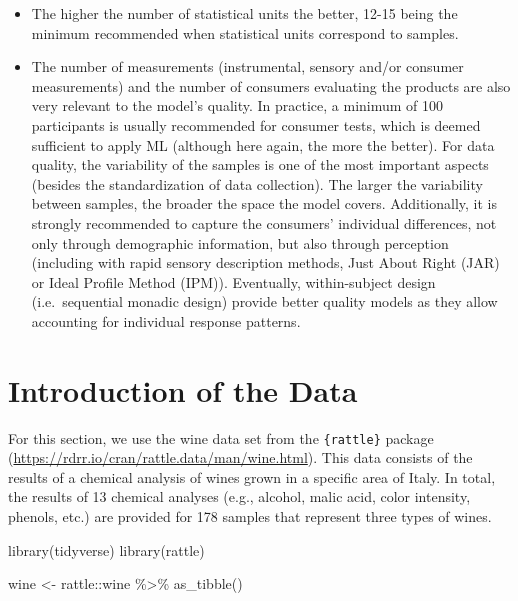 \documentclass[
]{krantz}
\makeatletter
\newenvironment{Shaded}{\begin{snugshade}}{\end{snugshade}}
\newcommand{\FunctionTok}[1]{\textcolor[rgb]{0,0,0}{#1}}
\newcommand{\NormalTok}[1]{#1}
\newcommand{\OtherTok}[1]{\textcolor[rgb]{0.37,0.37,0.37}{#1}}
\newcommand{\SpecialCharTok}[1]{\textcolor[rgb]{0,0,0}{#1}}
\providecommand{\tightlist}{%
  \setlength{\itemsep}{0pt}\setlength{\parskip}{0pt}}
\newenvironment{kframe}{%
\medskip{}
\setlength{\fboxsep}{.8em}
 \def\at@end@of@kframe{}%
 \ifinner\ifhmode%
  \def\at@end@of@kframe{\end{minipage}}%
  \begin{minipage}{\columnwidth}%
 \fi\fi%
 \def\FrameCommand##1{\hskip\@totalleftmargin \hskip-\fboxsep
 \colorbox{shadecolor}{##1}\hskip-\fboxsep
     \hskip-\linewidth \hskip-\@totalleftmargin \hskip\columnwidth}%
 \MakeFramed {\advance\hsize-\width
   \@totalleftmargin\z@ \linewidth\hsize
   \@setminipage}}%
 {\par\unskip\endMakeFramed%
 \at@end@of@kframe}
\renewenvironment{Shaded}{\begin{kframe}}{\end{kframe}}
\makeatother
\begin{document}
\begin{itemize}
\tightlist
\item
  The higher the number of statistical units the better, 12-15 being the minimum recommended when statistical units correspond to samples.
\item
  The number of measurements (instrumental, sensory and/or consumer measurements) and the number of consumers evaluating the products are also very relevant to the model's quality. In practice, a minimum of 100 participants is usually recommended for consumer tests, which is deemed sufficient to apply ML (although here again, the more the better).
  For data quality, the variability of the samples is one of the most important aspects (besides the standardization of data collection). The larger the variability between samples, the broader the space the model covers. Additionally, it is strongly recommended to capture the consumers' individual differences, not only through demographic information, but also through perception (including with rapid sensory description methods, Just About Right (JAR) or Ideal Profile Method (IPM)). Eventually, within-subject design (i.e.~sequential monadic design) provide better quality models as they allow accounting for individual response patterns.
\end{itemize}

\hypertarget{introduction-of-the-data}{%
\section{Introduction of the Data}\label{introduction-of-the-data}}

For this section, we use the wine data set from the \texttt{\{rattle\}} package (\url{https://rdrr.io/cran/rattle.data/man/wine.html}). This data consists of the results of a chemical analysis of wines grown in a specific area of Italy. In total, the results of 13 chemical analyses (e.g., alcohol, malic acid, color intensity, phenols, etc.) are provided for 178 samples that represent three types of wines.

\begin{Shaded}
\begin{Highlighting}[]
\FunctionTok{library}\NormalTok{(tidyverse)}
\FunctionTok{library}\NormalTok{(rattle)}

\NormalTok{wine }\OtherTok{\textless{}{-}}\NormalTok{ rattle}\SpecialCharTok{::}\NormalTok{wine }\SpecialCharTok{\%\textgreater{}\%} 
  \FunctionTok{as\_tibble}\NormalTok{()}
\end{Highlighting}
\end{Shaded}
\end{document}
